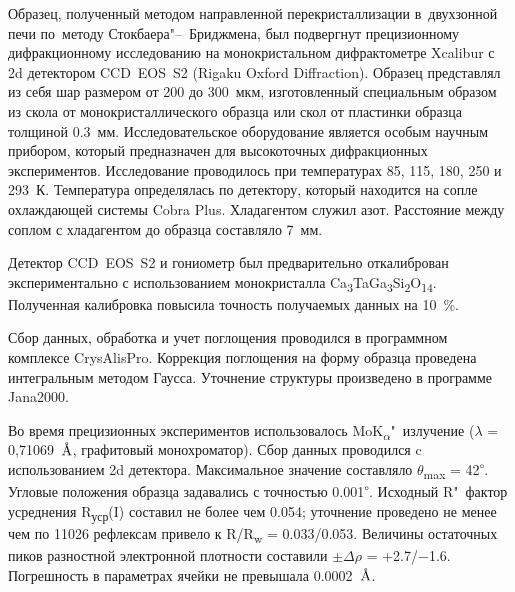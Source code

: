 Образец, полученный методом направленной перекристаллизации в~двухзонной печи по~методу Стокбаера"--~Бриджмена, был подвергнут прецизионному дифракционному исследованию на монокристальном дифрактометре Xcalibur с 2d детектором CCD~EOS~S2 (Rigaku Oxford Diffraction). Образец представлял из себя шар размером от 200 до 300~мкм, изготовленный специальным образом из скола от монокристаллического образца или скол от пластинки образца толщиной 0.3~мм. Исследовательское оборудование является  особым научным прибором, который предназначен для высокоточных дифракционных экспериментов. Исследование проводилось при температурах 85, 115, 180, 250 и 293~К\cite{Dudka2016}. Температура определялась по детектору, который находится на сопле охлаждающей системы Cobra Plus. Хладагентом служил азот. Расстояние между соплом с хладагентом до образца составляло 7~мм. 

Детектор CCD~EOS~S2 и гониометр был предварительно откалиброван экспериментально\cite{Dudka2010} с использованием монокристалла Ca\textsubscript{3}TaGa\textsubscript{3}Si\textsubscript{2}O\textsubscript{14}\cite{Dudka2016_b}. Полученная калибровка повысила точность получаемых данных на 10~\%.

Сбор данных, обработка и учет поглощения проводился в программном комплексе  CrysAlisPro. Коррекция поглощения на форму образца проведена интегральным методом Гаусса. Уточнение структуры произведено в программе Jana2000\cite{Dusek2001}.






Во время прецизионных  экспериментов использовалось MoK\textsubscript{$\alpha$}"~излучение ($\lambda$ = 0,71069~${\mbox{\normalfont\AA}}$, графитовый монохроматор). Сбор данных проводился c использованием 2d детектора. Максимальное значение составляло $\theta$\textsubscript{max} = 42\textsuperscript{$\circ$}.
Угловые положения образца задавались с точностью 0.001\textsuperscript{$\circ$}.
Исходный R"~фактор усреднения R\textsubscript{уср}(I) составил не более чем  0.054; уточнение проведено не менее чем по 11026 рефлексам привело к R/R\textsubscript{w} = 0.033/0.053. 
Величины остаточных пиков разностной электронной плотности составили $\pm\Delta$$\rho$ = +2.7/$-$1.6. 
Погрешность в параметрах ячейки не превышала 0.0002~{$\mbox{\normalfont\AA}$}. 

